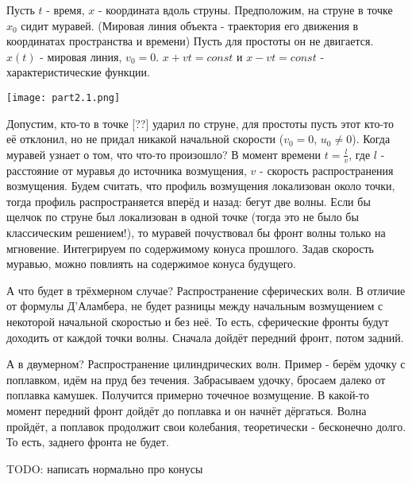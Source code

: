 \begin{example}
Пусть $t$ - время, $x$ - координата вдоль струны. Предположим, на струне в точке $x_0$ сидит муравей. (Мировая линия объекта - траектория его движения в координатах пространства и времени) Пусть для простоты он не двигается. $x(t)$ - мировая линия, $v_0 = 0$. $x + vt = const$ и $x -vt = const$ - характеристические функции.

\texttt{[image: part2.1.png]}

Допустим, кто-то в точке [??] ударил по струне, для простоты пусть этот кто-то её отклонил, но не придал никакой начальной скорости ($v_0 = 0$, $u_0 \neq 0$). Когда муравей узнает о том, что что-то произошло? В момент времени $ t = \frac {l} {v}$, где $l$ - расстояние от муравья до источника возмущения, $v$ - скорость распространения возмущения. Будем считать, что профиль возмущения локализован около точки, тогда профиль распространяется вперёд и назад: бегут две волны. Если бы щелчок по струне был локализован в одной точке (тогда это не было бы классическим решением!), то муравей почуствовал бы фронт волны только на мгновение.
Интегрируем по содержимому конуса прошлого. Задав скорость муравью, можно повлиять на содержимое конуса будущего.
\end{example}

{\small А что будет в трёхмерном случае? Распространение сферических волн. В отличие от формулы Д'Аламбера, не будет разницы между начальным возмущением с некоторой начальной скоростью и без неё. То есть, сферические фронты будут доходить от каждой точки волны. Сначала дойдёт передний фронт, потом задний.

А в двумерном? Распространение цилиндрических волн. Пример - берём удочку с поплавком, идём на пруд без течения. Забрасываем удочку, бросаем далеко от поплавка камушек. Получится примерно точечное возмущение. В какой-то момент передний фронт дойдёт до поплавка и он начнёт дёргаться. Волна пройдёт, а поплавок продолжит свои колебания, теоретически - бесконечно долго. То есть, заднего фронта не будет.}

TODO: написать нормально про конусы

